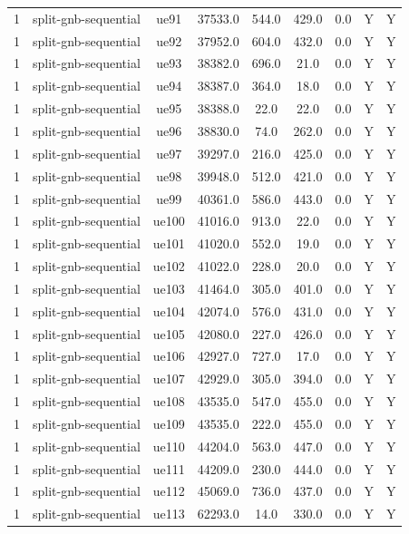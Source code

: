 \begin{table}[ht]
\begin{tabular}{|c|c|c|c|c|c|c|c|c|}
1 & split-gnb-sequential & ue91 & 37533.0 & 544.0 & 429.0 & 0.0 & Y & Y \\
1 & split-gnb-sequential & ue92 & 37952.0 & 604.0 & 432.0 & 0.0 & Y & Y \\
1 & split-gnb-sequential & ue93 & 38382.0 & 696.0 & 21.0 & 0.0 & Y & Y \\
1 & split-gnb-sequential & ue94 & 38387.0 & 364.0 & 18.0 & 0.0 & Y & Y \\
1 & split-gnb-sequential & ue95 & 38388.0 & 22.0 & 22.0 & 0.0 & Y & Y \\
1 & split-gnb-sequential & ue96 & 38830.0 & 74.0 & 262.0 & 0.0 & Y & Y \\
1 & split-gnb-sequential & ue97 & 39297.0 & 216.0 & 425.0 & 0.0 & Y & Y \\
1 & split-gnb-sequential & ue98 & 39948.0 & 512.0 & 421.0 & 0.0 & Y & Y \\
1 & split-gnb-sequential & ue99 & 40361.0 & 586.0 & 443.0 & 0.0 & Y & Y \\
1 & split-gnb-sequential & ue100 & 41016.0 & 913.0 & 22.0 & 0.0 & Y & Y \\
1 & split-gnb-sequential & ue101 & 41020.0 & 552.0 & 19.0 & 0.0 & Y & Y \\
1 & split-gnb-sequential & ue102 & 41022.0 & 228.0 & 20.0 & 0.0 & Y & Y \\
1 & split-gnb-sequential & ue103 & 41464.0 & 305.0 & 401.0 & 0.0 & Y & Y \\
1 & split-gnb-sequential & ue104 & 42074.0 & 576.0 & 431.0 & 0.0 & Y & Y \\
1 & split-gnb-sequential & ue105 & 42080.0 & 227.0 & 426.0 & 0.0 & Y & Y \\
1 & split-gnb-sequential & ue106 & 42927.0 & 727.0 & 17.0 & 0.0 & Y & Y \\
1 & split-gnb-sequential & ue107 & 42929.0 & 305.0 & 394.0 & 0.0 & Y & Y \\
1 & split-gnb-sequential & ue108 & 43535.0 & 547.0 & 455.0 & 0.0 & Y & Y \\
1 & split-gnb-sequential & ue109 & 43535.0 & 222.0 & 455.0 & 0.0 & Y & Y \\
1 & split-gnb-sequential & ue110 & 44204.0 & 563.0 & 447.0 & 0.0 & Y & Y \\
1 & split-gnb-sequential & ue111 & 44209.0 & 230.0 & 444.0 & 0.0 & Y & Y \\
1 & split-gnb-sequential & ue112 & 45069.0 & 736.0 & 437.0 & 0.0 & Y & Y \\
1 & split-gnb-sequential & ue113 & 62293.0 & 14.0 & 330.0 & 0.0 & Y & Y \\

\end{tabular}
\end{table}
